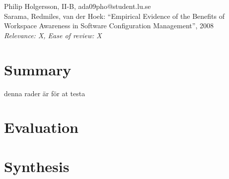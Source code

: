 \documentclass[a4paper]{article}
\begin{document}

Philip Holgersson, II-B, ada09pho@student.lu.se\\
Sarama, Redmiles, van der Hoek: ``Empirical Evidence of the Benefits of Workspace Awareness in Software Configuration Management'', 2008 \\
\textit{Relevance: X, Ease of review: X}

\section*{Summary}
denna rader är för at testa

\section*{Evaluation}



\section*{Synthesis}
\end{document}
